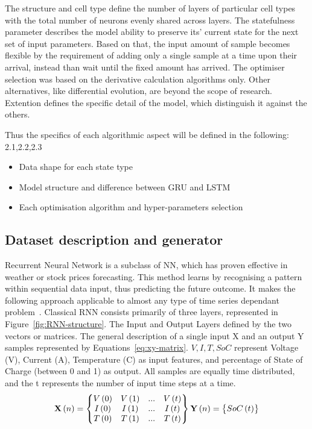 %
%
The structure and cell type define the number of layers of particular cell types with the total number of neurons evenly shared across layers.
The statefulness parameter describes the model ability to preserve its' current state for the next set of input parameters.
Based on that, the input amount of sample becomes flexible by the requirement of adding only a single sample at a time upon their arrival, instead than wait until the fixed amount has arrived.
The optimiser selection was based on the derivative calculation algorithms only.
Other alternatives, like differential evolution, are beyond the scope of research.
Extention defines the specific detail of the model, which distinguish it against the others.

%
%
Thus the specifics of each algorithmic aspect will be defined in the following: 2.1,2.2,2.3
\begin{itemize}
    \item Data shape for each state type
    \item Model structure and difference between GRU and LSTM
    \item Each optimisation algorithm and hyper-parameters selection
\end{itemize}

%
%
\subsection{Dataset description and generator} \label{subsec:dataset}
Recurrent Neural Network is a subclass of NN, which has proven effective in weather or stock prices forecasting.
This method learns by recognising a pattern within sequential data input, thus predicting the future outcome.
It makes the following approach applicable to almost any type of time series dependant problem~\cite{anton_battery_2013}.
Classical RNN consists primarily of three layers, represented in Figure~\ref{fig:RNN-structure}.
The Input and Output Layers defined by the two vectors or matrices.
The general description of a single input X and an output Y samples represented by Equations~\ref{eq:xy-matrix}.
$V, I, T, SoC$ represent Voltage (V), Current (A), Temperature (\textdegree{}C) as input features, and percentage of State of Charge (between 0 and 1) as output.
All samples are equally time distributed, and the t represents the number of input time steps at a time.
\begin{equation}
    \textbf{X} \left (n  \right ) = 
    \begin{Bmatrix}
        V \left (0  \right ) & V \left (1  \right ) & ... & V \left (t  \right )\\ 
        I \left (0  \right ) & I \left (1  \right ) & ... & I \left (t  \right )\\ 
        T \left (0  \right ) & T \left (1  \right ) & ... & T \left (t  \right )\\
    \end{Bmatrix}
    \\ \textbf{Y} \left (n  \right ) = 
    \begin{Bmatrix}
        SoC \left (t  \right ) 
    \end{Bmatrix}
\label{eq:xy-matrix}
\end{equation}


